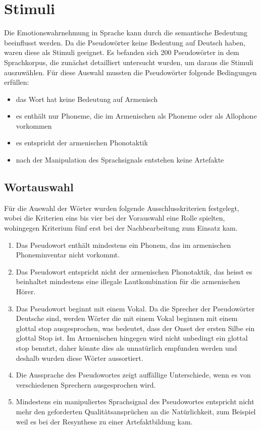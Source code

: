 \documentclass[11pt,a4paper,headsepline,twoside,toc=bibliography]{scrreprt}
\begin{document}
\section{Stimuli}
\label{sec:captain_overview}

Die Emotionswahrnehmung in Sprache kann durch die semantische Bedeutung beeinflusst werden. Da die Pseudowörter keine Bedeutung auf Deutsch haben, waren diese als Stimuli geeignet. Es befanden sich 200 Pseudowörter in dem Sprachkorpus, die zunächst detailliert untersucht wurden, um daraus die Stimuli auszuwählen. Für diese Auswahl mussten die Pseudowörter folgende Bedingungen erfüllen:

\begin{itemize}
	\item das Wort hat keine Bedeutung auf Armenisch
	\item es enthält nur Phoneme, die im Armenischen als Phoneme oder als Allophone vorkommen
	\item es entspricht der armenischen Phonotaktik
	\item nach der Manipulation des Sprachsignals entstehen keine Artefakte 
\end{itemize} 




\subsection{Wortauswahl}
\label{sec:pseudowords}

Für die Auswahl der Wörter wurden folgende Ausschlusskriterien festgelegt, wobei die Kriterien eins bis vier bei der Vorauswahl eine Rolle spielten, wohingegen Kriterium fünf erst bei der Nachbearbeitung zum
Einsatz kam.


\begin{enumerate}
	\item Das Pseudowort enthält	mindestens ein Phonem, das im armenischen Phoneminventar nicht vorkommt.
	\item Das Pseudowort entspricht nicht der armenischen Phonotaktik, das heisst es beinhaltet mindestens eine
	illegale Lautkombination für die armenischen Hörer.
	\item Das Pseudowort beginnt mit einem Vokal.
	Da die Sprecher der Pseudowörter Deutsche sind, werden Wörter die mit einem Vokal beginnen
	mit einem glottal stop ausgesprochen, was bedeutet, dass der Onset der ersten Silbe ein glottal Stop ist. 
	Im Armenischen hingegen wird nicht unbedingt ein glottal stop benutzt, daher könnte dies als unnatürlich empfunden werden und deshalb wurden diese Wörter aussortiert.
	\item Die Aussprache des Pseudowortes zeigt auffällige Unterschiede, wenn es von verschiedenen Sprechern ausgesprochen wird. 
	\item Mindestens ein manipuliertes Sprachsignal des Pseudowortes entspricht nicht mehr den geforderten
	Qualitätsansprüchen an die Natürlichkeit, zum Beispiel weil es bei der Resynthese zu einer Artefaktbildung kam.	
\end{enumerate}
\end{document}
